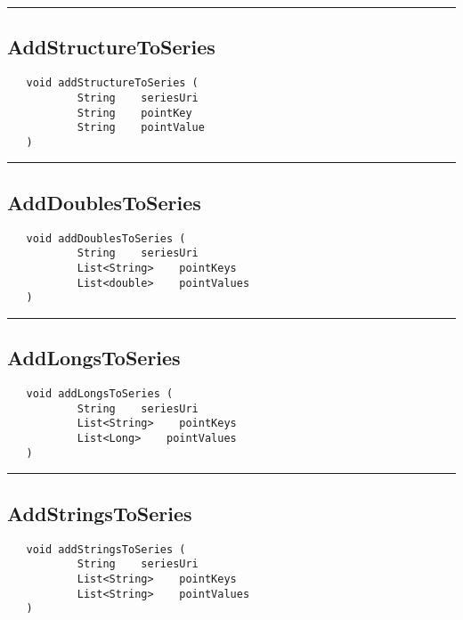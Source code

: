 \rule{15cm}{2pt}
\subsection{AddStructureToSeries}
\label{Api:AddStructureToSeries}
\begin{verbatim}
   void addStructureToSeries (
           String    seriesUri
           String    pointKey
           String    pointValue
   )
\end{verbatim}



\rule{15cm}{2pt}
\subsection{AddDoublesToSeries}
\label{Api:AddDoublesToSeries}
\begin{verbatim}
   void addDoublesToSeries (
           String    seriesUri
           List<String>    pointKeys
           List<double>    pointValues
   )
\end{verbatim}



\rule{15cm}{2pt}
\subsection{AddLongsToSeries}
\label{Api:AddLongsToSeries}
\begin{verbatim}
   void addLongsToSeries (
           String    seriesUri
           List<String>    pointKeys
           List<Long>    pointValues
   )
\end{verbatim}



\rule{15cm}{2pt}
\subsection{AddStringsToSeries}
\label{Api:AddStringsToSeries}
\begin{verbatim}
   void addStringsToSeries (
           String    seriesUri
           List<String>    pointKeys
           List<String>    pointValues
   )
\end{verbatim}



